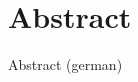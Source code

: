 %
\chapter*{Abstract}
\label{sec:abstract}
\vspace*{-10mm}

\blindtext

\vspace*{20mm}

{Abstract (german)}\label{sec:abstract-diff} \\

\blindtext
